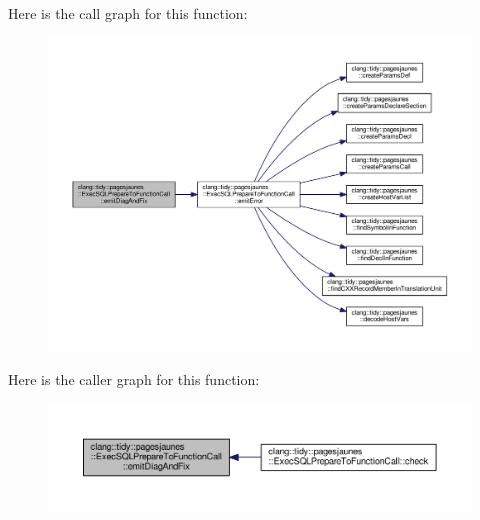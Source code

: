 Here is the call graph for this function\+:
\nopagebreak
\begin{figure}[H]
\begin{center}
\leavevmode
\includegraphics[width=350pt]{classclang_1_1tidy_1_1pagesjaunes_1_1_exec_s_q_l_prepare_to_function_call_a75ae581d7112559add71e34482ca8566_cgraph}
\end{center}
\end{figure}
Here is the caller graph for this function\+:
\nopagebreak
\begin{figure}[H]
\begin{center}
\leavevmode
\includegraphics[width=350pt]{classclang_1_1tidy_1_1pagesjaunes_1_1_exec_s_q_l_prepare_to_function_call_a75ae581d7112559add71e34482ca8566_icgraph}
\end{center}
\end{figure}
\mbox{\label{classclang_1_1tidy_1_1pagesjaunes_1_1_exec_s_q_l_prepare_to_function_call_a86fd460de74f1414467ab71679af689d}} 
